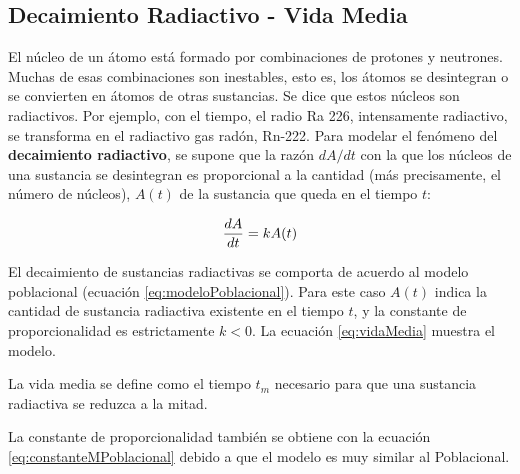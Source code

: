 \subsection{Decaimiento Radiactivo - Vida Media}

El núcleo de un átomo está formado por combinaciones de protones y neutrones. Muchas de esas combinaciones son inestables, esto es, los 
átomos se desintegran o se convierten en átomos de otras sustancias. Se dice que estos núcleos son radiactivos. Por ejemplo, con el tiempo, 
el radio Ra 226, intensamente radiactivo, se transforma en el radiactivo gas radón, Rn-222. Para modelar el fenómeno del \textbf{decaimiento 
radiactivo}, se supone que la razón $dA/dt$ con la que los núcleos de una sustancia se desintegran es proporcional a la cantidad (más precisamente, 
el número de núcleos), $A(t)$ de la sustancia que queda en el tiempo $t$:

\begin{equation}
	{dA\over dt} = kA(t)
	\label{eq:vidaMedia}
\end{equation}

El decaimiento de sustancias radiactivas se comporta de acuerdo al modelo poblacional (ecuación \ref{eq:modeloPoblacional}). Para este caso 
$A(t)$ indica la cantidad de sustancia radiactiva existente en el tiempo $t$, y la constante de proporcionalidad es estrictamente $k<0$. 
La ecuación \ref{eq:vidaMedia} muestra el modelo.

La vida media se define como el tiempo $t_m$ necesario para que una sustancia radiactiva se reduzca a la mitad. 

La constante de proporcionalidad también se obtiene con la ecuación \ref{eq:constanteMPoblacional} debido a que el modelo es muy similar al 
Poblacional.

